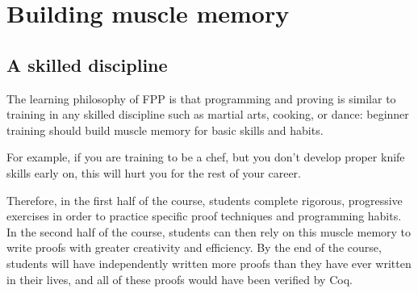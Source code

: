 
\chapter{Building muscle memory} %

\label{building-muscle-memory} %


\section{A skilled discipline}
The learning philosophy of FPP is that programming and proving is similar to training in any skilled discipline such as martial arts, cooking, or dance: beginner training should build muscle memory for basic skills and habits. 

For example, if you are training to be a chef, but you don't develop proper knife skills early on, this will hurt you for the rest of your career. 

Therefore, in the first half of the course, students complete rigorous, progressive exercises in order to practice specific proof techniques and programming habits. In the second half of the course, students can then rely on this muscle memory to write proofs with greater creativity and efficiency. By the end of the course, students will have independently written more proofs than they have ever written in their lives, and all of these proofs would have been verified by Coq.
